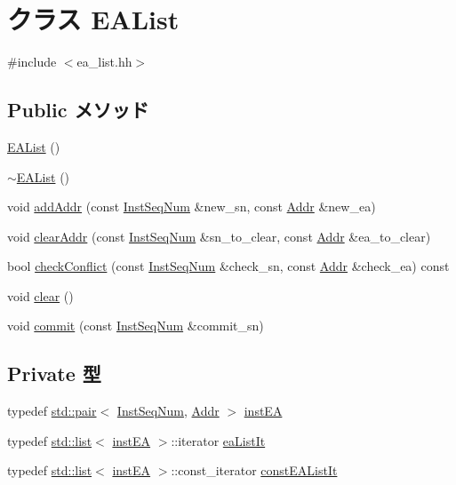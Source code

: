 \hypertarget{classEAList}{
\section{クラス EAList}
\label{classEAList}
}


{\ttfamily \#include $<$ea\_\-list.hh$>$}\subsection*{Public メソッド}
\begin{DoxyCompactItemize}
\item 
\hyperlink{classEAList_a46333c3216a1f17c75fca96b2ab6dc7a}{EAList} ()
\item 
\hyperlink{classEAList_a73d890a1090a402397e5a7657a5b3e29}{$\sim$EAList} ()
\item 
void \hyperlink{classEAList_a868bd0f41fcbdea9e0a8e85d962a5f8e}{addAddr} (const \hyperlink{inst__seq_8hh_a258d93d98edaedee089435c19ea2ea2e}{InstSeqNum} \&new\_\-sn, const \hyperlink{base_2types_8hh_af1bb03d6a4ee096394a6749f0a169232}{Addr} \&new\_\-ea)
\item 
void \hyperlink{classEAList_aa81385e8b59673c83884a6e3ad77db9a}{clearAddr} (const \hyperlink{inst__seq_8hh_a258d93d98edaedee089435c19ea2ea2e}{InstSeqNum} \&sn\_\-to\_\-clear, const \hyperlink{base_2types_8hh_af1bb03d6a4ee096394a6749f0a169232}{Addr} \&ea\_\-to\_\-clear)
\item 
bool \hyperlink{classEAList_a26a0f8ba9b35435ae8d4486031ef1752}{checkConflict} (const \hyperlink{inst__seq_8hh_a258d93d98edaedee089435c19ea2ea2e}{InstSeqNum} \&check\_\-sn, const \hyperlink{base_2types_8hh_af1bb03d6a4ee096394a6749f0a169232}{Addr} \&check\_\-ea) const 
\item 
void \hyperlink{classEAList_ac8bb3912a3ce86b15842e79d0b421204}{clear} ()
\item 
void \hyperlink{classEAList_a640b6f8ad0650459d42a51d323f601c2}{commit} (const \hyperlink{inst__seq_8hh_a258d93d98edaedee089435c19ea2ea2e}{InstSeqNum} \&commit\_\-sn)
\end{DoxyCompactItemize}
\subsection*{Private 型}
\begin{DoxyCompactItemize}
\item 
typedef \hyperlink{classstd_1_1pair}{std::pair}$<$ \hyperlink{inst__seq_8hh_a258d93d98edaedee089435c19ea2ea2e}{InstSeqNum}, \hyperlink{base_2types_8hh_af1bb03d6a4ee096394a6749f0a169232}{Addr} $>$ \hyperlink{classEAList_a070c73793b8096456a77aa2acc2a674d}{instEA}
\item 
typedef \hyperlink{classstd_1_1list}{std::list}$<$ \hyperlink{classstd_1_1pair}{instEA} $>$::iterator \hyperlink{classEAList_ad188172370c0b3d51c146fa8eb66b9f0}{eaListIt}
\item 
typedef \hyperlink{classstd_1_1list}{std::list}$<$ \hyperlink{classstd_1_1pair}{instEA} $>$::const\_\-iterator \hyperlink{classEAList_aa4e8e7ca0b8974dee456db31dd748004}{constEAListIt}
\end{DoxyCompactItemize}
